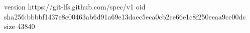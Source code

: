 version https://git-lfs.github.com/spec/v1
oid sha256:bbbbf1437e8c00463ab6d91a69e13daec5eca0cb2ce66e1c8f250eeaa9ce00dc
size 43840
